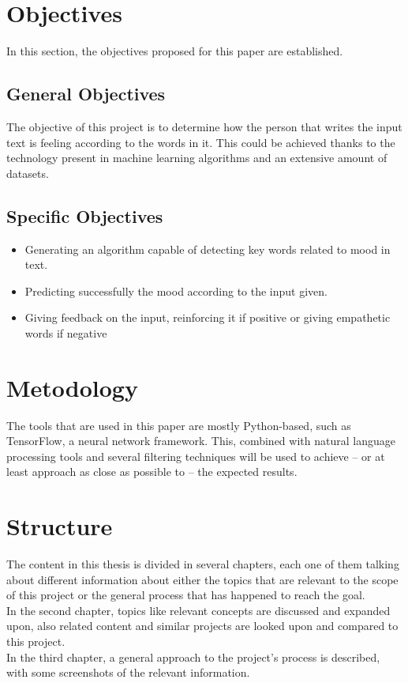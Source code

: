 \section{Objectives}
In this section, the objectives proposed for this paper are established.

\subsection{General Objectives}
The objective of this project is to determine how the person that writes the input text is feeling according to the words in it. This could be achieved thanks to the technology present in machine learning algorithms and an extensive amount of datasets.

\subsection{Specific Objectives}
\begin{itemize}
	\item Generating an algorithm capable of detecting key words related to mood in text.
	\item Predicting successfully the mood according to the input given.
	\item Giving feedback on the input, reinforcing it if positive or giving empathetic words if negative
\end{itemize}

\section{Metodology}
The tools that are used in this paper are mostly Python-based, such as TensorFlow, a neural network framework. This, combined with natural language processing tools and several filtering techniques will be used to achieve -- or at least approach as close as possible to -- the expected results.

\section{Structure}
The content in this thesis is divided in several chapters, each one of them talking about different information about either the topics that are relevant to the scope of this project or the general process that has happened to reach the goal.\\
In the second chapter, topics like relevant concepts are discussed and expanded upon, also related content and similar projects are looked upon and compared to this project.\\
In the third chapter, a general approach to the project's process is described, with some screenshots of the relevant information.
\clearpage